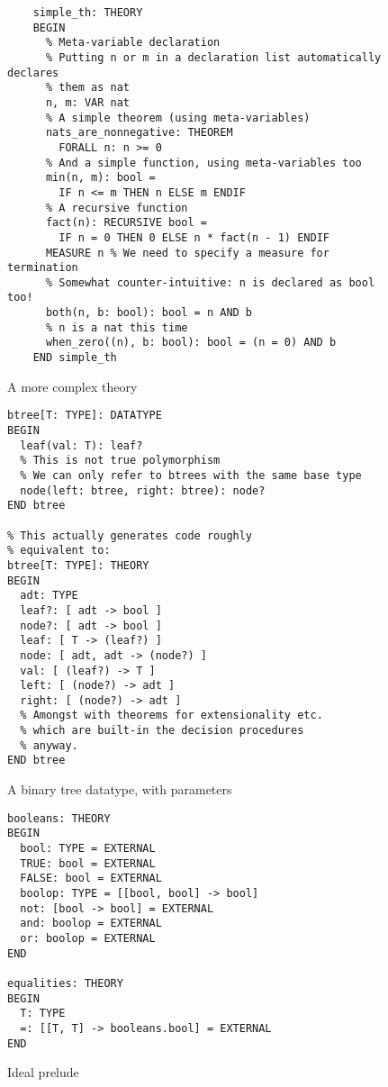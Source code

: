 \documentclass[utf8,a4paper]{article}
\begin{document}
\begin{figure}
  \centering
  \begin{verbatim}
    simple_th: THEORY
    BEGIN
      % Meta-variable declaration
      % Putting n or m in a declaration list automatically declares
      % them as nat
      n, m: VAR nat
      % A simple theorem (using meta-variables)
      nats_are_nonnegative: THEOREM
        FORALL n: n >= 0
      % And a simple function, using meta-variables too
      min(n, m): bool =
        IF n <= m THEN n ELSE m ENDIF
      % A recursive function
      fact(n): RECURSIVE bool =
        IF n = 0 THEN 0 ELSE n * fact(n - 1) ENDIF
      MEASURE n % We need to specify a measure for termination
      % Somewhat counter-intuitive: n is declared as bool too!
      both(n, b: bool): bool = n AND b
      % n is a nat this time
      when_zero((n), b: bool): bool = (n = 0) AND b
    END simple_th
  \end{verbatim}
  \caption{A more complex theory}
  \label{fig:cplxth}
\end{figure}

\begin{figure}
  \centering
  \begin{verbatim}
btree[T: TYPE]: DATATYPE
BEGIN
  leaf(val: T): leaf?
  % This is not true polymorphism
  % We can only refer to btrees with the same base type
  node(left: btree, right: btree): node?
END btree

% This actually generates code roughly
% equivalent to:
btree[T: TYPE]: THEORY
BEGIN
  adt: TYPE
  leaf?: [ adt -> bool ]
  node?: [ adt -> bool ]
  leaf: [ T -> (leaf?) ]
  node: [ adt, adt -> (node?) ]
  val: [ (leaf?) -> T ]
  left: [ (node?) -> adt ]
  right: [ (node?) -> adt ]
  % Amongst with theorems for extensionality etc.
  % which are built-in the decision procedures
  % anyway.
END btree
  \end{verbatim}
  \caption{A binary tree datatype, with parameters}
  \label{fig:datatype}
\end{figure}

\begin{figure}
  \centering
  \begin{verbatim}
booleans: THEORY
BEGIN
  bool: TYPE = EXTERNAL
  TRUE: bool = EXTERNAL
  FALSE: bool = EXTERNAL
  boolop: TYPE = [[bool, bool] -> bool]
  not: [bool -> bool] = EXTERNAL
  and: boolop = EXTERNAL
  or: boolop = EXTERNAL
END

equalities: THEORY
BEGIN
  T: TYPE
  =: [[T, T] -> booleans.bool] = EXTERNAL
END
  \end{verbatim}
  \caption{Ideal prelude}
  \label{fig:prelude}
\end{figure}
\end{document}
